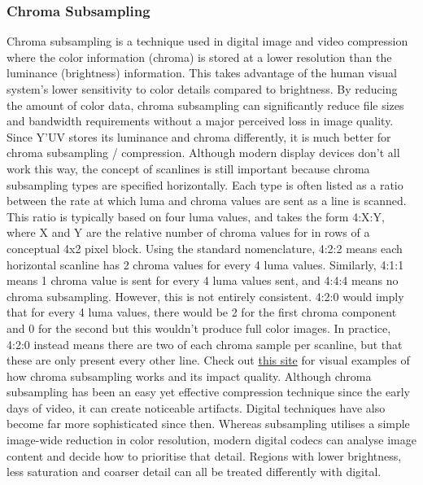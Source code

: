\subsubsection{Chroma Subsampling}
Chroma subsampling is a technique used in digital image and video compression where the color information (chroma) is stored at a lower resolution than the luminance (brightness) information.
This takes advantage of the human visual system's lower sensitivity to color details compared to brightness. By reducing the amount of color data, chroma subsampling can significantly reduce file sizes and bandwidth requirements without a major perceived loss in image quality.
Since Y'UV stores its luminance and chroma differently, it is much better for chroma subsampling / compression.
\nl
Although modern display devices don't all work this way, the concept of scanlines is still important because chroma subsampling types are specified horizontally. Each type is often listed as a ratio between the rate at which luma and chroma values are sent as a line is scanned. This ratio is typically based on four luma values, and takes the form 4:X:Y, where X and Y are the relative number of chroma values for in rows of a conceptual 4x2 pixel block.
\nl
Using the standard nomenclature, 4:2:2 means each horizontal scanline has 2 chroma values for every 4 luma values. Similarly, 4:1:1 means 1 chroma value is sent for every 4 luma values sent, and 4:4:4 means no chroma subsampling. However, this is not entirely consistent. 4:2:0 would imply that for every 4 luma values, there would be 2 for the first chroma component and 0 for the second but this wouldn't produce full color images. In practice, 4:2:0 instead means there are two of each chroma sample per scanline, but that these are only present every other line.
\nl
Check out \href{https://www.red.com/red-101/video-chroma-subsampling#:~:text=Using%20the%20standard%20nomenclature%2C%204:2:2%20means%20each,subsampling.%20However%2C%20this%20is%20not%20entirely%20consistent.}{this site} for visual examples of how chroma subsampling works and its impact quality.
\nl
Although chroma subsampling has been an easy yet effective compression technique since the early days of video, it can create noticeable artifacts. Digital techniques have also become far more sophisticated since then.
Whereas subsampling utilises a simple image-wide reduction in color resolution, modern digital codecs can analyse image content and decide how to prioritise that detail. Regions with lower brightness, less saturation and coarser detail can all be treated differently with digital.


